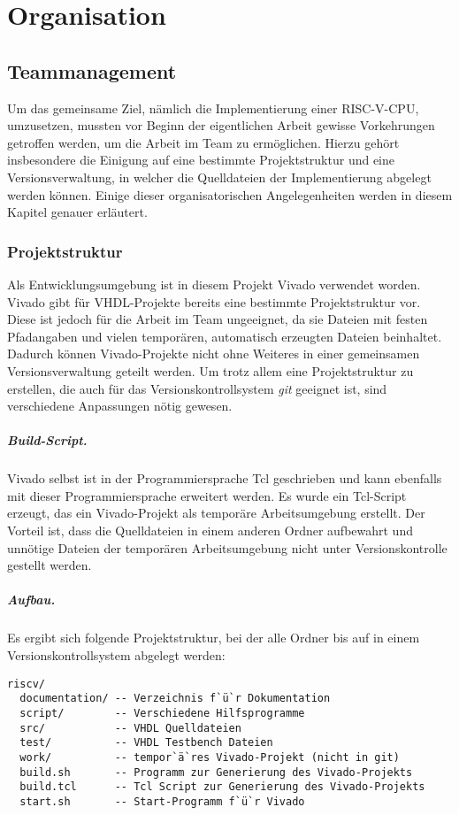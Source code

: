 \chapter{Organisation} 
\label{organisation} 

\section{Teammanagement}
Um das gemeinsame Ziel, nämlich die Implementierung einer RISC-V-CPU,
umzusetzen, mussten vor Beginn der eigentlichen Arbeit gewisse
Vorkehrungen getroffen werden, um die Arbeit im Team zu ermöglichen.
Hierzu gehört insbesondere die Einigung auf eine bestimmte
Projektstruktur und eine Versionsverwaltung, in welcher die Quelldateien
der Implementierung abgelegt werden können. Einige dieser
organisatorischen Angelegenheiten werden in diesem Kapitel 
genauer erläutert.

\subsection{Projektstruktur}
Als Entwicklungsumgebung ist in diesem Projekt Vivado verwendet worden. Vivado gibt für
VHDL-Projekte bereits eine bestimmte Projektstruktur vor. Diese ist
jedoch für die Arbeit im Team ungeeignet, da sie Dateien mit festen 
Pfadangaben und vielen temporären, automatisch erzeugten Dateien
beinhaltet. Dadurch können Vivado-Projekte nicht ohne Weiteres in einer
gemeinsamen Versionsverwaltung geteilt werden. Um trotz allem eine
Projektstruktur zu erstellen, die auch für das Versionskontrollsystem
\emph{git} geeignet ist, sind verschiedene Anpassungen nötig gewesen.

\paragraph{Build-Script.}
Vivado selbst ist in der Programmiersprache Tcl geschrieben und kann
ebenfalls mit dieser Programmiersprache erweitert werden. Es wurde ein Tcl-Script erzeugt, das ein Vivado-Projekt als temporäre Arbeitsumgebung erstellt. Der Vorteil ist, dass die Quelldateien in
einem anderen Ordner aufbewahrt und unnötige Dateien der
temporären Arbeitsumgebung nicht unter Versionskontrolle gestellt werden.

\paragraph{Aufbau.} Es ergibt sich folgende Projektstruktur, bei der alle Ordner
bis auf  in einem Versionskontrollsystem abgelegt werden:
\begin{lstlisting}[inputencoding={utf8},extendedchars=false,escapeinside=``]
riscv/
  documentation/ -- Verzeichnis f`ü`r Dokumentation
  script/        -- Verschiedene Hilfsprogramme 
  src/           -- VHDL Quelldateien 
  test/          -- VHDL Testbench Dateien 
  work/          -- tempor`ä`res Vivado-Projekt (nicht in git) 
  build.sh       -- Programm zur Generierung des Vivado-Projekts
  build.tcl      -- Tcl Script zur Generierung des Vivado-Projekts
  start.sh       -- Start-Programm f`ü`r Vivado 
\end{lstlisting}


